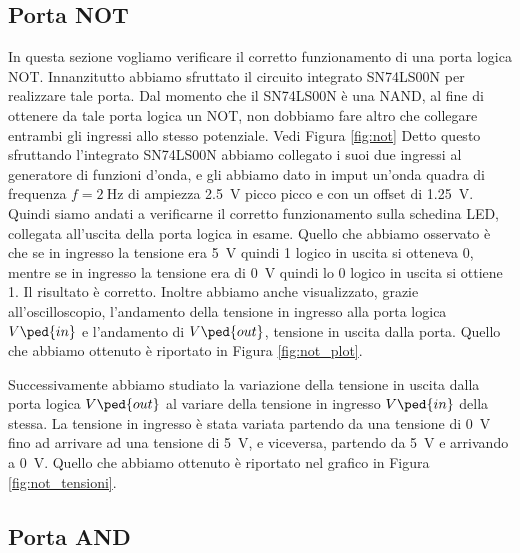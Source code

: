 \subsection*{Porta NOT}

In questa sezione vogliamo verificare il corretto funzionamento di una porta logica NOT. Innanzitutto abbiamo sfruttato il circuito integrato SN74LS00N per realizzare tale porta. Dal momento che il SN74LS00N è una NAND, al fine di ottenere da tale porta logica un NOT, non dobbiamo fare altro che collegare entrambi gli ingressi allo stesso potenziale. Vedi Figura \ref{fig:not}
Detto questo sfruttando l'integrato SN74LS00N abbiamo collegato i suoi due ingressi al generatore di funzioni d'onda, e gli abbiamo dato in imput un'onda quadra di frequenza $f=\SI{2}{\hertz}$ di ampiezza \SI{2.5}{\volt} picco picco e con un offset di \SI{1.25}{\volt}.
Quindi siamo andati a verificarne il corretto funzionamento sulla schedina LED, collegata all'uscita della porta logica in esame. Quello che abbiamo osservato è che se in ingresso la tensione era \SI{+5}{\volt} quindi 1 logico in uscita si otteneva 0, mentre se in ingresso la tensione era di \SI{0}{\volt} quindi lo 0 logico in uscita si ottiene 1. Il risultato è corretto. Inoltre abbiamo anche visualizzato, grazie all'oscilloscopio, l'andamento della tensione in ingresso alla porta logica $V\ped{in}$ e l'andamento di $V\ped{out}$, tensione in uscita dalla porta. Quello che abbiamo ottenuto è riportato in Figura \ref{fig:not_plot}.

Successivamente abbiamo studiato la variazione della tensione in uscita dalla porta logica $V\ped{out}$ al variare della tensione in ingresso $V\ped{in}$ della stessa. La tensione in ingresso è stata variata partendo da una tensione di \SI{0}{\volt} fino ad arrivare ad una tensione di \SI{+5}{\volt}, e viceversa, partendo da \SI{+5}{\volt} e arrivando a \SI{0}{\volt}. Quello che abbiamo ottenuto è riportato nel grafico in Figura \ref{fig:not_tensioni}.


\subsection*{Porta AND}

